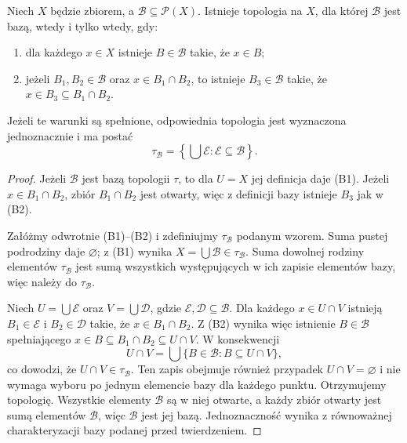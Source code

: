 \begin{twierdzenie}
\label{thm:topog-kryterium-bazy}
Niech $X$ będzie zbiorem, a $\mathcal B\subseteq\mathcal P(X)$.
Istnieje topologia na $X$, dla której $\mathcal B$ jest bazą,
wtedy i tylko wtedy, gdy:
\begin{enumerate}[label=(B\arabic*)]
\item dla każdego $x\in X$ istnieje $B\in\mathcal B$
      takie, że $x\in B$;
\item jeżeli $B_1,B_2\in\mathcal B$ oraz
      $x\in B_1\cap B_2$, to istnieje $B_3\in\mathcal B$
      takie, że $x\in B_3\subseteq B_1\cap B_2$.
\end{enumerate}
Jeżeli te warunki są spełnione, odpowiednia topologia
jest wyznaczona jednoznacznie i ma postać
\[
\tau_{\mathcal B}=
\left\{\bigcup\mathcal E:\mathcal E\subseteq\mathcal B\right\}.
\]
\end{twierdzenie}
\begin{proof}
Jeżeli $\mathcal B$ jest bazą topologii $\tau$, to dla
$U=X$ jej definicja daje (B1). Jeżeli
$x\in B_1\cap B_2$, zbiór $B_1\cap B_2$ jest otwarty,
więc z definicji bazy istnieje $B_3$ jak w (B2).

Załóżmy odwrotnie (B1)--(B2) i zdefiniujmy
$\tau_{\mathcal B}$ podanym wzorem. Suma pustej
podrodziny daje $\varnothing$; z (B1) wynika
$X=\bigcup\mathcal B\in\tau_{\mathcal B}$.
Suma dowolnej rodziny elementów $\tau_{\mathcal B}$
jest sumą wszystkich występujących w ich zapisie
elementów bazy, więc należy do $\tau_{\mathcal B}$.

Niech $U=\bigcup\mathcal E$ oraz $V=\bigcup\mathcal D$,
gdzie $\mathcal E,\mathcal D\subseteq\mathcal B$.
Dla każdego $x\in U\cap V$ istnieją
$B_1\in\mathcal E$ i $B_2\in\mathcal D$
takie, że $x\in B_1\cap B_2$. Z (B2) wynika więc
istnienie $B\in\mathcal B$ spełniającego
$x\in B\subseteq B_1\cap B_2\subseteq U\cap V$.
W konsekwencji
\[
U\cap V=\bigcup\{B\in\mathcal B:B\subseteq U\cap V\},
\]
co dowodzi, że $U\cap V\in\tau_{\mathcal B}$.
Ten zapis obejmuje również przypadek $U\cap V=\varnothing$
i nie wymaga wyboru po jednym elemencie bazy dla każdego punktu.
Otrzymujemy topologię. Wszystkie elementy
$\mathcal B$ są w niej otwarte, a każdy zbiór otwarty
jest sumą elementów $\mathcal B$, więc $\mathcal B$
jest jej bazą. Jednoznaczność wynika z równoważnej
charakteryzacji bazy podanej przed twierdzeniem.
\end{proof}

